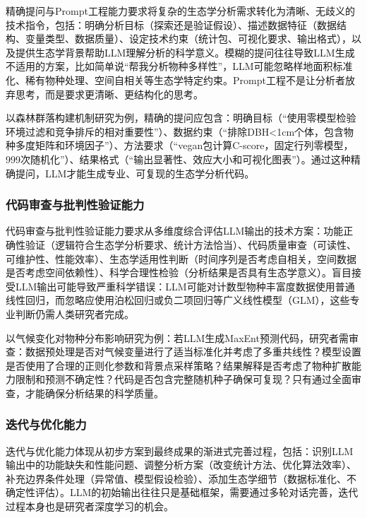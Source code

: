 \documentclass[
  twoside,12pt,fontset=none]{ctexbook}
\begin{document}
精确提问与Prompt工程能力要求将复杂的生态学分析需求转化为清晰、无歧义的技术指令，包括：明确分析目标（探索还是验证假设）、描述数据特征（数据结构、变量类型、数据质量）、设定技术约束（统计包、可视化要求、输出格式），以及提供生态学背景帮助LLM理解分析的科学意义。模糊的提问往往导致LLM生成不适用的方案，比如简单说``帮我分析物种多样性''，LLM可能忽略样地面积标准化、稀有物种处理、空间自相关等生态学特定约束。Prompt工程不是让分析者放弃思考，而是要求更清晰、更结构化的思考。

以森林群落构建机制研究为例，精确的提问应包含：明确目标（``使用零模型检验环境过滤和竞争排斥的相对重要性''）、数据约束（``排除DBH\textless1cm个体，包含物种多度矩阵和环境因子''）、方法要求（``vegan包计算C-score，固定行列零模型，999次随机化''）、结果格式（``输出显著性、效应大小和可视化图表''）。通过这种精确提问，LLM才能生成专业、可复现的生态学分析代码。

\hypertarget{ux4ee3ux7801ux5ba1ux67e5ux4e0eux6279ux5224ux6027ux9a8cux8bc1ux80fdux529b}{%
\subsubsection{代码审查与批判性验证能力}\label{ux4ee3ux7801ux5ba1ux67e5ux4e0eux6279ux5224ux6027ux9a8cux8bc1ux80fdux529b}}

代码审查与批判性验证能力要求从多维度综合评估LLM输出的技术方案：功能正确性验证（逻辑符合生态学分析要求、统计方法恰当）、代码质量审查（可读性、可维护性、性能效率）、生态学适用性判断（时间序列是否考虑自相关，空间数据是否考虑空间依赖性）、科学合理性检验（分析结果是否具有生态学意义）。盲目接受LLM输出可能导致严重科学错误：LLM可能对计数型物种丰富度数据使用普通线性回归，而忽略应使用泊松回归或负二项回归等广义线性模型（GLM），这些专业判断仍需人类研究者完成。

以气候变化对物种分布影响研究为例：若LLM生成MaxEnt预测代码，研究者需审查：数据预处理是否对气候变量进行了适当标准化并考虑了多重共线性？模型设置是否使用了合理的正则化参数和背景点采样策略？结果解释是否考虑了物种扩散能力限制和预测不确定性？代码是否包含完整随机种子确保可复现？只有通过全面审查，才能确保分析结果的科学质量。

\hypertarget{ux8fedux4ee3ux4e0eux4f18ux5316ux80fdux529b}{%
\subsubsection{迭代与优化能力}\label{ux8fedux4ee3ux4e0eux4f18ux5316ux80fdux529b}}

迭代与优化能力体现从初步方案到最终成果的渐进式完善过程，包括：识别LLM输出中的功能缺失和性能问题、调整分析方案（改变统计方法、优化算法效率）、补充边界条件处理（异常值、模型假设检验）、添加生态学细节（数据标准化、不确定性评估）。LLM的初始输出往往只是基础框架，需要通过多轮对话完善，迭代过程本身也是研究者深度学习的机会。
\end{document}
